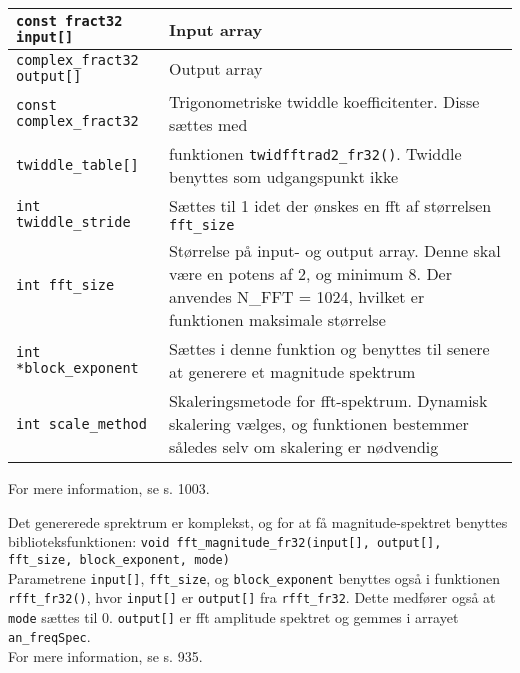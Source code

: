 \begin{center}
    \begin{tabular}{ | l | p{} |}
    \hline
    \verb+const fract32 input[]+		& Input array					\\ \hline
    \verb+complex_fract32 output[]+ 	& Output array					\\ \hline
    \verb+const complex_fract32+ 		& Trigonometriske twiddle koefficitenter. Disse sættes med   \\
    	\verb+twiddle_table[]+  			& funktionen \verb+twidfftrad2_fr32()+. Twiddle benyttes som udgangspunkt ikke 	\\ \hline
    \verb+int twiddle_stride+			& Sættes til 1 idet der ønskes en fft af størrelsen \verb+fft_size+	\\ \hline
	\verb+int fft_size+    				& Størrelse på input- og output array. Denne skal være en potens af 2, og minimum 8. Der anvendes N\_FFT = 1024, hvilket er funktionen maksimale størrelse\\ \hline
	\verb+int *block_exponent+			& Sættes i denne funktion og benyttes til senere at generere et magnitude spektrum\\ \hline
	\verb+int scale_method+		& Skaleringsmetode for fft-spektrum. Dynamisk skalering vælges, og funktionen bestemmer således selv om skalering er nødvendig \\ \hline
    \end{tabular}
\end{center}
For mere information, se \citep{C_Cpp_man_for_bf} s. 1003. 

Det genererede sprektrum er komplekst, og for at få magnitude-spektret benyttes biblioteksfunktionen:
\verb+void fft_magnitude_fr32(input[], output[], fft_size, block_exponent, mode)+ \\
Parametrene \verb+input[]+, \verb+fft_size+, og \verb+block_exponent+ benyttes også i funktionen \verb+rfft_fr32()+, hvor \verb+input[]+ er \verb+output[]+ fra \verb+rfft_fr32+. Dette medfører også at \verb+mode+ sættes til 0. \verb+output[]+ er fft amplitude spektret og gemmes i arrayet \verb+an_freqSpec+. \\
For mere information, se \citep{C_Cpp_man_for_bf} s. 935.

